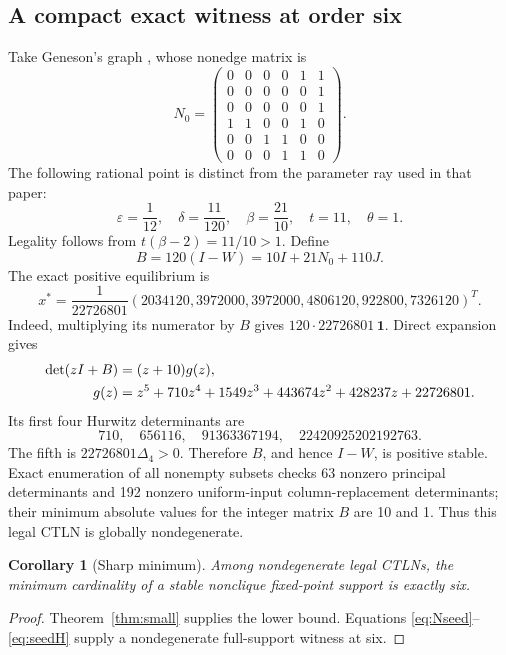 \documentclass[11pt,a4paper]{article}
\newtheorem{corollary}[theorem]{Corollary}
\theoremstyle{definition}\newtheorem{definition}[theorem]{Definition}
\theoremstyle{remark}\newtheorem{remark}[theorem]{Remark}
\newcommand{\ones}{\mathbf{1}}
\newcommand{\eps}{\varepsilon}
\begin{document}
\subsection{A compact exact witness at order six}\label{sec:witness}
Take Geneson's graph \cite[Theorem 3.2]{G2026}, whose nonedge matrix is
\begin{equation}\label{eq:Nseed}
 N_0=\begin{pmatrix}
0&0&0&0&1&1\\
0&0&0&0&0&1\\
0&0&0&0&0&1\\
1&1&0&0&1&0\\
0&0&1&1&0&0\\
0&0&0&1&1&0
\end{pmatrix}.
\end{equation}
The following rational point is distinct from the parameter ray used in that paper:
\begin{equation}\label{eq:seedparams}
 \eps=\frac1{12},\quad\delta=\frac{11}{120},\quad
 \beta=\frac{21}{10},\quad t=11,\quad\theta=1.
\end{equation}
Legality follows from $t(\beta-2)=11/10>1$. Define
\[
 B=120(I-W)=10I+21N_0+110J.
\]
The exact positive equilibrium is
\begin{equation}\label{eq:xseed}
 x^*=\frac1{22726801}
 (2034120,3972000,3972000,4806120,922800,7326120)^T.
\end{equation}
Indeed, multiplying its numerator by $B$ gives $120\cdot22726801\,\ones$.
Direct expansion gives
\begin{align}\label{eq:seedchar}
 \det(zI+B)&=(z+10)g(z),\notag\\
 g(z)&=z^5+710z^4+1549z^3+443674z^2+428237z+22726801.
\end{align}
Its first four Hurwitz determinants are
\begin{equation}\label{eq:seedH}
 710,\quad656116,\quad91363367194,\quad22420925202192763.
\end{equation}
The fifth is $22726801\Delta_4>0$. Therefore $B$, and hence $I-W$, is positive stable. Exact enumeration of all nonempty subsets checks 63 nonzero principal determinants and 192 nonzero uniform-input column-replacement determinants; their minimum absolute values for the integer matrix $B$ are 10 and 1. Thus this legal CTLN is globally nondegenerate.

\begin{corollary}[Sharp minimum]\label{cor:minimum}
Among nondegenerate legal CTLNs, the minimum cardinality of a stable nonclique fixed-point support is exactly six.
\end{corollary}
\begin{proof}
Theorem~\ref{thm:small} supplies the lower bound. Equations \eqref{eq:Nseed}--\eqref{eq:seedH} supply a nondegenerate full-support witness at six.
\end{proof}
\end{document}
